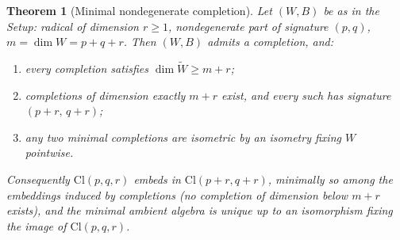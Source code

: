 \documentclass[11pt]{article}
\newtheorem{theorem}{Theorem}[section]
\theoremstyle{definition}
\newcommand{\Cl}{\mathrm{Cl}}
\begin{document}
\begin{theorem}[Minimal nondegenerate completion]\label{thm:main}
Let $(W,B)$ be as in the Setup: radical of dimension $r \geq 1$, nondegenerate part of signature $(p,q)$, $m = \dim W = p + q + r$. Then $(W,B)$ admits a completion, and:
\begin{enumerate}
\item every completion satisfies $\dim \widetilde W \geq m + r$;
\item completions of dimension exactly $m + r$ exist, and every such has signature $(p{+}r,\, q{+}r)$;
\item any two minimal completions are isometric by an isometry fixing $W$ pointwise.
\end{enumerate}
Consequently $\Cl(p,q,r)$ embeds in $\Cl(p{+}r, q{+}r)$, minimally so among the embeddings induced by completions (no completion of dimension below $m + r$ exists), and the minimal ambient algebra is unique up to an isomorphism fixing the image of $\Cl(p,q,r)$.
\end{theorem}
\end{document}
